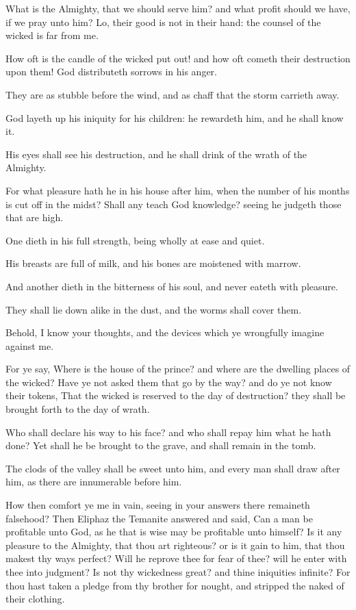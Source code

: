 \Verse What is the Almighty, that we should serve him? and what profit should we have, if we pray unto him?  \Verse Lo, their good is not in their hand: the counsel of the wicked is far from me.

\Verse How oft is the candle of the wicked put out! and how oft cometh their destruction upon them! God distributeth sorrows in his anger.

\Verse They are as stubble before the wind, and as chaff that the storm carrieth away.

\Verse God layeth up his iniquity for his children: he rewardeth him, and he shall know it.

\Verse His eyes shall see his destruction, and he shall drink of the wrath of the Almighty.

\Verse For what pleasure hath he in his house after him, when the number of his months is cut off in the midst?  \Verse Shall any teach God knowledge? seeing he judgeth those that are high.

\Verse One dieth in his full strength, being wholly at ease and quiet.

\Verse His breasts are full of milk, and his bones are moistened with marrow.

\Verse And another dieth in the bitterness of his soul, and never eateth with pleasure.

\Verse They shall lie down alike in the dust, and the worms shall cover them.

\Verse Behold, I know your thoughts, and the devices which ye wrongfully imagine against me.

\Verse For ye say, Where is the house of the prince? and where are the dwelling places of the wicked?  \Verse Have ye not asked them that go by the way? and do ye not know their tokens, \Verse That the wicked is reserved to the day of destruction? they shall be brought forth to the day of wrath.

\Verse Who shall declare his way to his face? and who shall repay him what he hath done?  \Verse Yet shall he be brought to the grave, and shall remain in the tomb.

\Verse The clods of the valley shall be sweet unto him, and every man shall draw after him, as there are innumerable before him.

\Verse How then comfort ye me in vain, seeing in your answers there remaineth falsehood?  
\Chapter
\Verse Then Eliphaz the Temanite answered and said, \Verse Can a man be profitable unto God, as he that is wise may be profitable unto himself?  \Verse Is it any pleasure to the Almighty, that thou art righteous? or is it gain to him, that thou makest thy ways perfect?  \Verse Will he reprove thee for fear of thee? will he enter with thee into judgment?  \Verse Is not thy wickedness great? and thine iniquities infinite?  \Verse For thou hast taken a pledge from thy brother for nought, and stripped the naked of their clothing.

